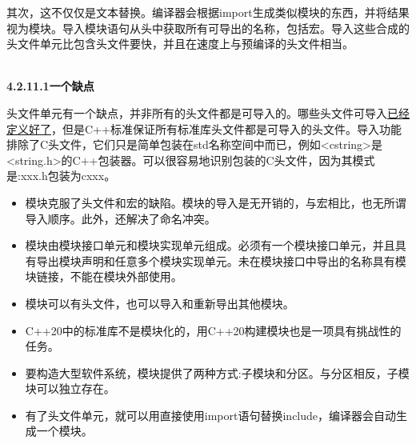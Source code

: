 其次，这不仅仅是文本替换。编译器会根据import生成类似模块的东西，并将结果视为模块。导入模块语句从头中获取所有可导出的名称，包括宏。导入这些合成的头文件单元比包含头文件要快，并且在速度上与预编译的头文件相当。

\hspace*{\fill} \\ %
\noindent
\textbf{4.2.11.1\hspace{0.2cm}一个缺点}

头文件单元有一个缺点，并非所有的头文件都是可导入的。哪些头文件可导入\href{https://en.cppreference.com/w/cpp/language/ub}{已经定义好了}，但是C++标准保证所有标准库头文件都是可导入的头文件。导入功能排除了C头文件，它们只是简单包装在std名称空间中而已，例如<cstring>是<string.h>的C++包装器。可以很容易地识别包装的C头文件，因为其模式是:xxx.h包装为cxxx。

\begin{tcolorbox}[breakable,enhanced jigsaw,colback=blue!5!white,colframe=blue!75!black,title={使用Microsoft编译器构建可执行文件}]

\begin{itemize}
\item 
模块克服了头文件和宏的缺陷。模块的导入是无开销的，与宏相比，也无所谓导入顺序。此外，还解决了命名冲突。

\item 
模块由模块接口单元和模块实现单元组成。必须有一个模块接口单元，并且具有导出模块声明和任意多个模块实现单元。未在模块接口中导出的名称具有模块链接，不能在模块外部使用。

\item 
模块可以有头文件，也可以导入和重新导出其他模块。

\item 
C++20中的标准库不是模块化的，用C++20构建模块也是一项具有挑战性的任务。

\item 
要构造大型软件系统，模块提供了两种方式:子模块和分区。与分区相反，子模块可以独立存在。

\item 
有了头文件单元，就可以用直接使用import语句替换include，编译器会自动生成一个模块。
\end{itemize}

\end{tcolorbox}

\newpage









































